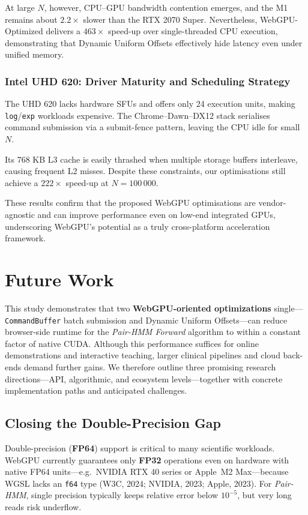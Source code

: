 \documentclass[PhD]{PHlab-thesis}
\begin{document}
At large $N$, however, CPU–GPU bandwidth contention emerges, and the M1 remains about $2.2\times$ slower than the RTX 2070 Super.  
Nevertheless, WebGPU-Optimized delivers a $463\times$ speed-up over single-threaded CPU execution, demonstrating that Dynamic Uniform Offsets effectively hide latency even under unified memory.

\subsection{Intel UHD 620: Driver Maturity and Scheduling Strategy}
The UHD 620 lacks hardware SFUs and offers only 24 execution units, making \texttt{log}/\texttt{exp} workloads expensive.  
The Chrome–Dawn–DX12 stack serialises command submission via a submit-fence pattern, leaving the CPU idle for small $N$.

Its 768 KB L3 cache is easily thrashed when multiple storage buffers interleave, causing frequent L2 misses.  
Despite these constraints, our optimisations still achieve a $222\times$ speed-up at $N = 100\,000$.

These results confirm that the proposed WebGPU optimisations are vendor-agnostic and can improve performance even on low-end integrated GPUs, underscoring WebGPU’s potential as a truly cross-platform acceleration framework.




\chapter{Future Work}

This study demonstrates that two \textbf{WebGPU-oriented optimizations} single—\texttt{CommandBuffer} batch submission and Dynamic Uniform Offsets—can reduce browser-side runtime for the \emph{Pair-HMM Forward} algorithm to within a constant factor of native CUDA. Although this performance suffices for online demonstrations and interactive teaching, larger clinical pipelines and cloud back-ends demand further gains. We therefore outline three promising research directions—API, algorithmic, and ecosystem levels—together with concrete implementation paths and anticipated challenges.

\section{Closing the Double-Precision Gap}

Double-precision (\textbf{FP64}) support is critical to many scientific workloads. WebGPU currently guarantees only \textbf{FP32} operations even on hardware with native FP64 units—e.g.\ NVIDIA RTX 40 series or Apple~M2 Max—because WGSL lacks an \texttt{f64} type (W3C, 2024; NVIDIA, 2023; Apple, 2023). For \emph{Pair-HMM}, single precision typically keeps relative error below $10^{-5}$, but very long reads risk underflow.
\end{document}
